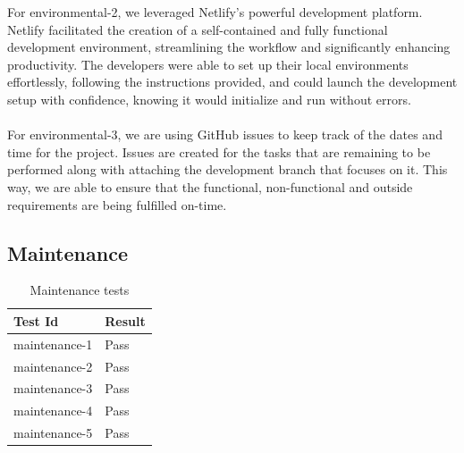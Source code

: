 \documentclass[12pt, titlepage]{article}
\begin{document}
\newpage

For environmental-2, we leveraged Netlify's powerful development platform. Netlify facilitated the creation of a self-contained and fully functional development environment, streamlining the workflow and significantly enhancing productivity. The developers were able to set up their local environments effortlessly, following the instructions provided, and could launch the development setup with confidence, knowing it would initialize and run without errors.
\\ \\
For environmental-3, we are using GitHub issues to keep track of the dates and time for the project. Issues are created for the tasks that are remaining to be performed along with attaching the development branch that focuses on it. This way, we are able to ensure that the functional, non-functional and outside requirements are being fulfilled on-time.


\subsection{Maintenance}

\begin{center}
\begin{longtable}{|p{4cm} | p{4cm}| }
\caption{Maintenance tests}
\hline
\textbf{Test Id} & \textbf{Result} \\
\hline
maintenance-1 & Pass \\
\hline
maintenance-2 & Pass \\
\hline
maintenance-3 & Pass \\
\hline
maintenance-4 & Pass \\
\hline
maintenance-5 & Pass \\
\hline

\end{longtable}
\end{center}
\end{document}
